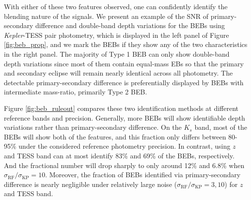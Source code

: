 \documentclass{aastex63}
\begin{document}
    With either of these two features observed, one can confidently identify the blending nature of the signals. We present an example of the SNR of primary-secondary difference and double-band depth variations for the BEBs using \emph{Kepler}-TESS pair photometry, which is displayed in the left panel of Figure \ref{fig:beb_prop}, and we mark the BEBs if they show any of the two characteristics in the right panel. The majority of Type 1 BEB can only show double-band depth variations since most of them contain  equal-mass EBs so that the primary and secondary eclipse will remain nearly identical across all photometry. The detectable primary-secondary difference is preferentially displayed by BEBs with intermediate mass-ratio, primarily Type 2 BEB.
    
    Figure \ref{fig:beb_ruleout} compares these two identification methods at different reference bands and precision. Generally, more BEBs will show identifiable depth variations rather than primary-secondary difference. On the $K_s$ band, most of the BEBs will show both of the features, and this fraction only differs between 80-95\% under the considered reference photometry precision. In contrast, using $z$ and TESS band can at most identify 83\% and 69\% of the BEBs, respectively. And the fractional number will drop sharply to only around 12\% and 6.8\% when $\sigma_\mathrm{RF}/\sigma_\mathrm{KP}=10$. Moreover, the fraction of BEBs identified via primary-secondary difference is nearly negligible under relatively large noise ($\sigma_\mathrm{RF}/\sigma_\mathrm{KP}=3,10$) for $z$ and TESS band.
\end{document}
